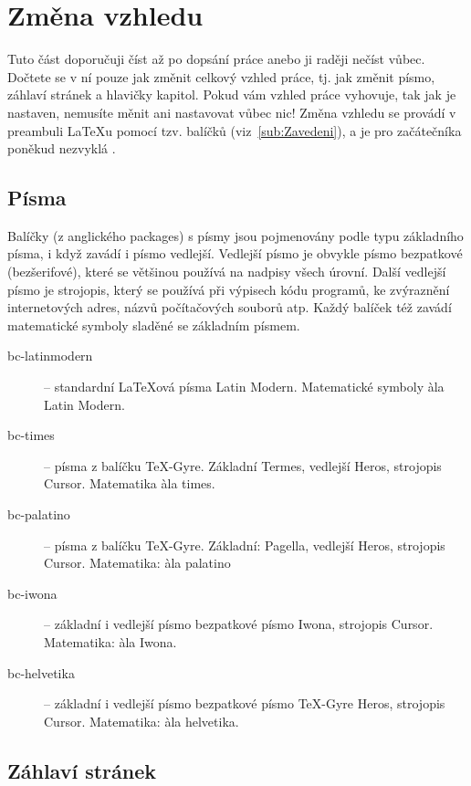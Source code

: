 \section{Změna vzhledu \label{sec:Zm=00011Bna-vzhledu}}

Tuto část doporučuji číst až po dopsání práce anebo ji raději nečíst
vůbec. Dočtete se v ní pouze jak změnit celkový vzhled práce, tj.
jak změnit písmo, záhlaví stránek a hlavičky kapitol. Pokud vám vzhled
práce vyhovuje, tak jak je nastaven, nemusíte měnit ani nastavovat
vůbec nic! Změna vzhledu se provádí v preambuli \LaTeX{}u pomocí tzv.
balíčků (viz~\ref{sub:Zavedeni}), a je pro začátečníka poněkud nezvyklá
.


\subsection{Písma}

Balíčky (z anglického packages) s písmy jsou pojmenovány podle typu
základního písma, i když zavádí i písmo vedlejší. Vedlejší písmo je
obvykle písmo bezpatkové (bezšerifové), které se většinou používá
na nadpisy všech úrovní. Další vedlejší písmo je strojopis, který
se používá při výpisech kódu programů, ke zvýraznění internetových
adres, názvů počítačových souborů atp. Každý balíček též zavádí matematické
symboly sladěné se základním písmem.

\begin{description}
\item [{bc-latinmodern}] -- standardní \LaTeX{}ová písma Latin Modern.
Matematické symboly \`ala Latin Modern.
\item [{bc-times}] -- písma z balíčku \TeX-Gyre. Základní Termes, vedlejší
Heros, strojopis Cursor. Matematika \`ala times.
\item [{bc-palatino}] -- písma z balíčku \TeX-Gyre. Základní: Pagella,
vedlejší Heros, strojopis Cursor. Matematika: \`ala palatino
\item [{bc-iwona}] -- základní i vedlejší písmo bezpatkové písmo Iwona,
strojopis  Cursor. Matematika: \`ala Iwona.
\item [{bc-helvetika}] -- základní i vedlejší písmo bezpatkové písmo \TeX-Gyre
Heros, strojopis Cursor. Matematika: \`ala helvetika.
\end{description}

\subsection{Záhlaví stránek}

